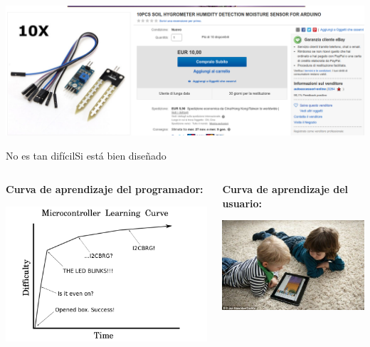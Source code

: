 \documentclass[]{beamer}
\begin{document}
\begin{frame}
    \includegraphics[width=\textwidth]{Docs/soil_humidity}
\end{frame}

\begin{frame}{No es tan difícil}{Si está bien diseñado}
  \begin{columns}
    \begin{column}{0.5\textwidth}
      \center
      \textbf{Curva de aprendizaje del programador:}

      \includegraphics[width=\textwidth]{Docs/micro_lc}
    \end{column}
    \begin{column}{0.5\textwidth}
      \center
      \textbf{Curva de aprendizaje del usuario:}

      \includegraphics[width=\textwidth]{Docs/baby_tablet}
    \end{column}
\end{columns}
\end{frame}
\end{document}
